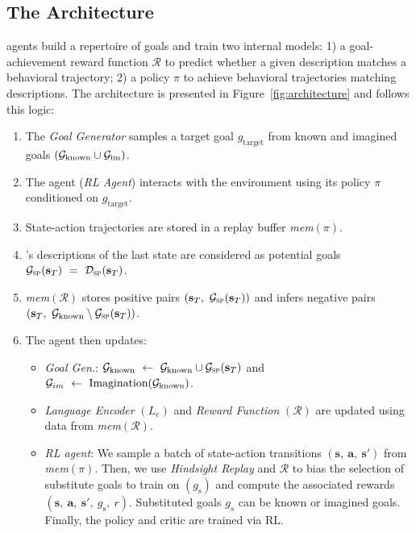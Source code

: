 \subsection{The \imagine Architecture}
\label{sec:architecture}
\imagine agents build a repertoire of goals and train two internal models: 1) a goal-achievement reward function $\mathcal{R}$ to predict whether a given description matches a behavioral trajectory; 2) a policy $\pi$ to achieve behavioral trajectories matching descriptions. The architecture is presented in Figure~\ref{fig:architecture} and follows this logic:  
\begin{enumerate}
    \item The \textit{Goal Generator} samples a target goal $g_{\text{target}}$ from known and imagined goals $(\mathcal{G}_\text{known} \cup \mathcal{G}_\text{im})$.
    \item The agent (\textit{RL Agent}) interacts with the environment using its policy $\pi$ conditioned on $g_\text{target}$.
    \item State-action trajectories are stored in a replay buffer \textit{mem$(\pi)$}.
    \item \SP's descriptions of the last state are considered as potential goals $\mathcal{G}_{\text{\textsc{sp}}}(\mathbf{s}_T)~=~\mathcal{D}_{\text{\textsc{sp}}}(\textbf{s}_T)$.
    \item \textit{mem$(\mathcal{R})$} stores positive pairs $(\mathbf{s}_T,~ \mathcal{G}_{\text{\textsc{sp}}}(\mathbf{s}_T))$ and infers negative pairs $(\mathbf{s}_T,~\mathcal{G}_\text{known} \setminus \mathcal{G}_{\text{\textsc{sp}}}(\mathbf{s}_T))$.
    \item The agent then updates:
    \begin{itemize}
        \item \textit{Goal Gen.}: $\mathcal{G}_\text{known}~\gets~\mathcal{G}_\text{known} \cup \mathcal{G}_{\text{\textsc{sp}}}(\textbf{s}_T)$ and  $\mathcal{G}_{im}~\gets~\text{Imagination}(\mathcal{G}_\text{known})$.
        \item \textit{Language Encoder} $(L_e)$ and \textit{Reward Function} $(\mathcal{R})$ are updated using data from \textit{mem$(\mathcal{R})$}.
        \item \textit{RL agent}: We sample a batch of state-action transitions $(\mathbf{s},~\mathbf{a},~\mathbf{s}')$ from \textit{mem$(\pi)$}. Then, we use \textit{Hindsight Replay} and $\mathcal{R}$ to bias the selection of substitute goals to train on $(g_\text{s})$ and compute the associated rewards $(\mathbf{s},~\mathbf{a},~\mathbf{s'},~g_\text{s},~r)$. Substituted goals $g_s$ can be known or imagined goals. Finally, the policy and critic are trained via RL.
    \end{itemize}
\end{enumerate}

